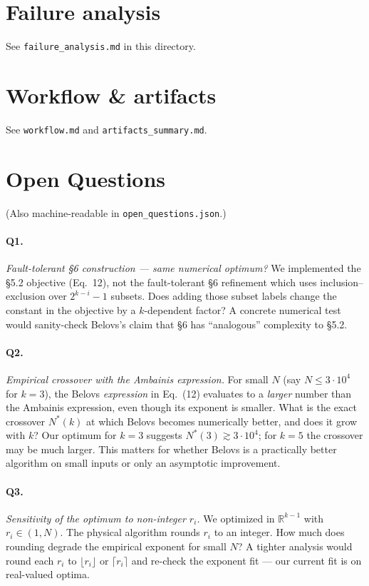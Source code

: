 \documentclass[11pt]{article}
\begin{document}
\section{Failure analysis}
See \verb|failure_analysis.md| in this directory.

\section{Workflow \& artifacts}
See \verb|workflow.md| and \verb|artifacts_summary.md|.

\section*{Open Questions}
(Also machine-readable in \texttt{open\_questions.json}.)

\paragraph{Q1.} \emph{Fault-tolerant §6 construction — same numerical
optimum?}  We implemented the §5.2 objective (Eq.~12), not the fault-tolerant
§6 refinement which uses inclusion–exclusion over $2^{k-i}-1$ subsets.  Does
adding those subset labels change the constant in the objective by a
$k$-dependent factor?  A concrete numerical test would sanity-check
Belovs's claim that §6 has ``analogous'' complexity to §5.2.

\paragraph{Q2.} \emph{Empirical crossover with the Ambainis expression.}
For small $N$ (say $N \le 3 \cdot 10^4$ for $k=3$), the Belovs
\emph{expression} in Eq.~(12) evaluates to a \emph{larger} number than
the Ambainis expression, even though its exponent is smaller.
What is the exact crossover $N^*(k)$ at which Belovs becomes numerically
better, and does it grow with $k$?  Our optimum for $k=3$ suggests
$N^*(3) \gtrsim 3\cdot 10^4$; for $k=5$ the crossover may be much
larger.  This matters for whether Belovs is a practically better
algorithm on small inputs or only an asymptotic improvement.

\paragraph{Q3.} \emph{Sensitivity of the optimum to non-integer $r_i$.}
We optimized in $\mathbb{R}^{k-1}$ with $r_i \in (1, N)$.  The physical
algorithm rounds $r_i$ to an integer.  How much does rounding degrade
the empirical exponent for small $N$?  A tighter analysis would round
each $r_i$ to $\lfloor r_i \rfloor$ or $\lceil r_i\rceil$ and re-check
the exponent fit --- our current fit is on real-valued optima.
\end{document}

